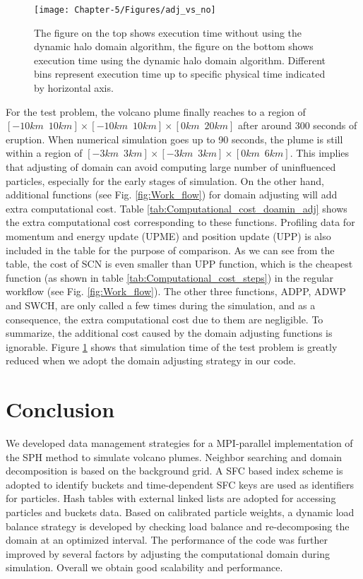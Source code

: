 \begin{figure}
\centering
{\texttt{[image: Chapter-5/Figures/adj\_vs\_no]}}
{\caption{The figure on the top shows execution time without using the dynamic halo domain algorithm, the figure on the bottom shows execution time using the dynamic halo domain algorithm. Different bins represent execution time up to specific physical time indicated by horizontal axis.}
\label{fig:adj_vs_no}}
\end{figure}

For the test problem, the volcano plume finally reaches to a region of $[-10km \,\,\, 10km] \times [-10km\,\,\,10km] \times [0km\,\,\,20km]$ after around 300 seconds of eruption. When numerical simulation goes up to 90 seconds, the plume is still within a region of $[-3km\,\,\,3km] \times [-3km\,\,\,3km] \times [0km\,\,\,6km]$. This implies that adjusting of domain can avoid computing large number of uninfluenced particles, especially for the early stages of simulation. On the other hand, additional functions (see Fig. \ref{fig:Work_flow}) for domain adjusting will add extra computational cost. Table \ref{tab:Computational_cost_doamin_adj} shows the extra computational cost corresponding to these functions. Profiling data for momentum and energy update (UPME) and position update (UPP) is also included in the table for the purpose of comparison. As we can see from the table, the cost of SCN is even smaller than UPP function, which is the cheapest function (as shown in table \ref{tab:Computational_cost_steps}) in the regular workflow (see Fig. \ref{fig:Work_flow}). The other three functions, ADPP, ADWP and SWCH, are only called a few times during the simulation, and as a consequence, the extra computational cost due to them are negligible. To summarize, the additional cost caused by the domain adjusting functions is ignorable.
Figure \ref{fig:adj_vs_no} shows that simulation time of the test problem is greatly reduced when we adopt the domain adjusting strategy in our code.

\section{Conclusion}
We developed data management strategies for a MPI-parallel implementation of the SPH method to simulate volcano plumes. Neighbor searching and domain decomposition is based on the background grid. A SFC based index scheme is adopted to identify buckets and time-dependent SFC keys are used as identifiers for particles. 
Hash tables with external linked lists are adopted for accessing particles and buckets data. Based on calibrated particle weights, a dynamic load balance strategy is developed by checking load balance and re-decomposing the domain at an optimized interval. The performance of the code was further improved by several factors by adjusting the computational domain during simulation.
Overall we obtain good scalability and performance.

